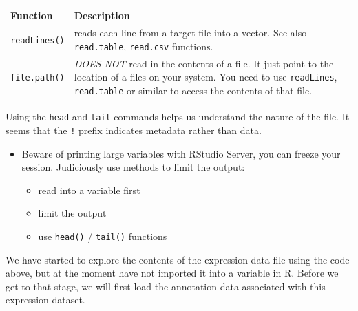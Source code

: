 \documentclass[a4paper]{book}
\providecommand{\tightlist}{%
  \setlength{\itemsep}{0pt}\setlength{\parskip}{0pt}}
\newenvironment{rmdblock}[1]
  {\vspace{1.5em}\begin{shaded*}
  \begin{itemize}
  \renewcommand{\labelitemi}{
    \raisebox{-.7\height}[0pt][0pt]{
      {\setkeys{Gin}{width=3em,keepaspectratio}\texttt{[image: images/\#1]}}
    }
  }
  \item
  }
  {
  \end{itemize}
  \end{shaded*}
  }
\newenvironment{rmdcaution}
  {\begin{rmdblock}{caution}}
  {\end{rmdblock}}
\begin{document}
\begin{longtable}[]{@{}ll@{}}
\toprule
\begin{minipage}[b]{0.14\columnwidth}\raggedright\strut
Function\strut
\end{minipage} & \begin{minipage}[b]{0.80\columnwidth}\raggedright\strut
Description\strut
\end{minipage}\tabularnewline
\midrule
\endhead
\begin{minipage}[t]{0.14\columnwidth}\raggedright\strut
\texttt{readLines()}\strut
\end{minipage} & \begin{minipage}[t]{0.80\columnwidth}\raggedright\strut
reads each line from a target file into a vector. See also
\texttt{read.table}, \texttt{read.csv} functions.\strut
\end{minipage}\tabularnewline
\begin{minipage}[t]{0.14\columnwidth}\raggedright\strut
\texttt{file.path()}\strut
\end{minipage} & \begin{minipage}[t]{0.80\columnwidth}\raggedright\strut
\emph{DOES NOT} read in the contents of a file. It just point to the
location of a files on your system. You need to use \texttt{readLines},
\texttt{read.table} or similar to access the contents of that
file.\strut
\end{minipage}\tabularnewline
\bottomrule
\end{longtable}

Using the \texttt{head} and \texttt{tail} commands helps us understand
the nature of the file. It seems that the \texttt{!} prefix indicates
metadata rather than data.

\begin{rmdcaution}
Beware of printing large variables with RStudio Server, you can freeze
your session. Judiciously use methods to limit the output:

\begin{itemize}
\tightlist
\item
  read into a variable first
\item
  limit the output
\item
  use \texttt{head()} / \texttt{tail()} functions
\end{itemize}
\end{rmdcaution}

We have started to explore the contents of the expression data file
using the code above, but at the moment have not imported it into a
variable in R. Before we get to that stage, we will first load the
annotation data associated with this expression dataset.
\end{document}
